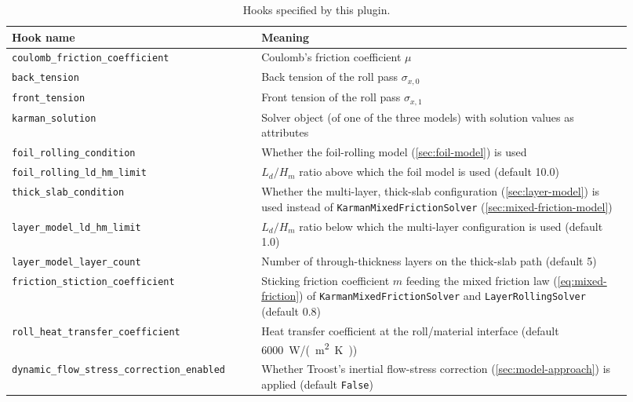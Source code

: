 \documentclass[11pt]{PyRollDocs}
\begin{document}
    \begin{table}
        \centering
        \caption{Hooks specified by this plugin.}
        \label{tab:hookspecs}
        \begin{tabular}{@{}p{0.37\linewidth}p{0.55\linewidth}@{}}
            \toprule
            Hook name & Meaning \\
            \midrule
            \texttt{coulomb\_friction\_coefficient} & Coulomb's friction coefficient $\mu$ \\
            \texttt{back\_tension} & Back tension of the roll pass $\sigma_{x,0}$ \\
            \texttt{front\_tension} & Front tension of the roll pass $\sigma_{x,1}$ \\
            \texttt{karman\_solution} & Solver object (of one of the three models) with solution values as attributes \\
            \texttt{foil\_rolling\_condition} & Whether the foil-rolling model (\autoref{sec:foil-model}) is used \\
            \texttt{foil\_rolling\_ld\_hm\_limit} & $L_d/H_m$ ratio above which the foil model is used (default 10.0) \\
            \texttt{thick\_slab\_condition} & Whether the multi-layer, thick-slab configuration (\autoref{sec:layer-model}) is used instead of \texttt{KarmanMixedFrictionSolver} (\autoref{sec:mixed-friction-model}) \\
            \texttt{layer\_model\_ld\_hm\_limit} & $L_d/H_m$ ratio below which the multi-layer configuration is used (default 1.0) \\
            \texttt{layer\_model\_layer\_count} & Number of through-thickness layers on the thick-slab path (default 5) \\
            \texttt{friction\_stiction\_coefficient} & Sticking friction coefficient $m$ feeding the mixed friction law (\autoref{eq:mixed-friction}) of \texttt{KarmanMixedFrictionSolver} and \texttt{LayerRollingSolver} (default 0.8) \\
            \texttt{roll\_\allowbreak heat\_\allowbreak transfer\_\allowbreak coefficient} & Heat transfer coefficient at the roll/material interface (default \SI{6000}{W/(m^2 K)}) \\
            \texttt{dynamic\_\allowbreak flow\_\allowbreak stress\_\allowbreak correction\_\allowbreak enabled} & Whether Troost's inertial flow-stress correction (\autoref{sec:model-approach}) is applied (default \texttt{False}) \\
            \bottomrule
        \end{tabular}
    \end{table}

    \printbibliography
\end{document}
